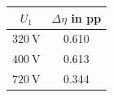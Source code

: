 
\begin{solutiontable}[ht]
	\centering  %
	\begin{tabular}{cc}
		\toprule
		\multicolumn{1}{c}{$U_\mathrm{1}$} & \multicolumn{1}{c}{$\Delta\eta$ in pp} \\
		\midrule
		$\SI{320}{\volt}$                  & 0.610                                  \\
		$\SI{400}{\volt}$                  & 0.613                                  \\
		$\SI{720}{\volt}$                  & 0.344                                  \\
		\bottomrule
	\end{tabular}
	\caption{Efficiency gain at $U_\mathrm{1}$ (pp = percentage points).}
	\label{table:EfficiencyGain}
\end{solutiontable}

